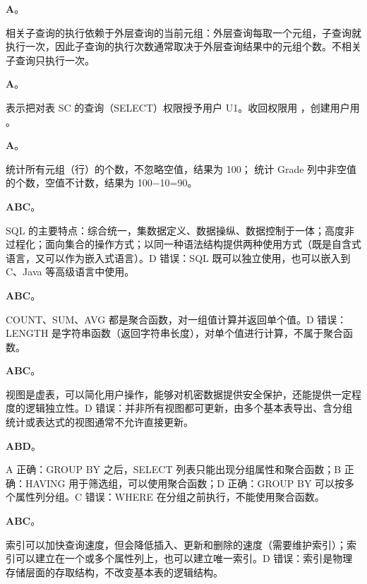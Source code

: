\documentclass[a4paper,11pt]{article}
\begin{document}
\q \textbf{A}。\begin{analysis}相关子查询的执行依赖于外层查询的当前元组：外层查询每取一个元组，子查询就执行一次，因此子查询的执行次数通常取决于外层查询结果中的元组个数。不相关子查询只执行一次。\end{analysis}

\q \textbf{A}。\begin{analysis} 表示把对表 SC 的查询（SELECT）权限授予用户 U1。收回权限用 ，创建用户用 。\end{analysis}

\q \textbf{A}。\begin{analysis} 统计所有元组（行）的个数，不忽略空值，结果为 100； 统计 Grade 列中非空值的个数，空值不计数，结果为 100−10=90。\end{analysis}


\q \textbf{ABC}。\begin{analysis}SQL 的主要特点：综合统一，集数据定义、数据操纵、数据控制于一体；高度非过程化；面向集合的操作方式；以同一种语法结构提供两种使用方式（既是自含式语言，又可以作为嵌入式语言）。D 错误：SQL 既可以独立使用，也可以嵌入到 C、Java 等高级语言中使用。\end{analysis}

\q \textbf{ABC}。\begin{analysis}COUNT、SUM、AVG 都是聚合函数，对一组值计算并返回单个值。D 错误：LENGTH 是字符串函数（返回字符串长度），对单个值进行计算，不属于聚合函数。\end{analysis}

\q \textbf{ABC}。\begin{analysis}视图是虚表，可以简化用户操作，能够对机密数据提供安全保护，还能提供一定程度的逻辑独立性。D 错误：并非所有视图都可更新，由多个基本表导出、含分组统计或表达式的视图通常不允许直接更新。\end{analysis}

\q \textbf{ABD}。\begin{analysis}A 正确：GROUP BY 之后，SELECT 列表只能出现分组属性和聚合函数；B 正确：HAVING 用于筛选组，可以使用聚合函数；D 正确：GROUP BY 可以按多个属性列分组。C 错误：WHERE 在分组之前执行，不能使用聚合函数。\end{analysis}

\q \textbf{ABC}。\begin{analysis}索引可以加快查询速度，但会降低插入、更新和删除的速度（需要维护索引）；索引可以建立在一个或多个属性列上，也可以建立唯一索引。D 错误：索引是物理存储层面的存取结构，不改变基本表的逻辑结构。\end{analysis}
\end{document}
